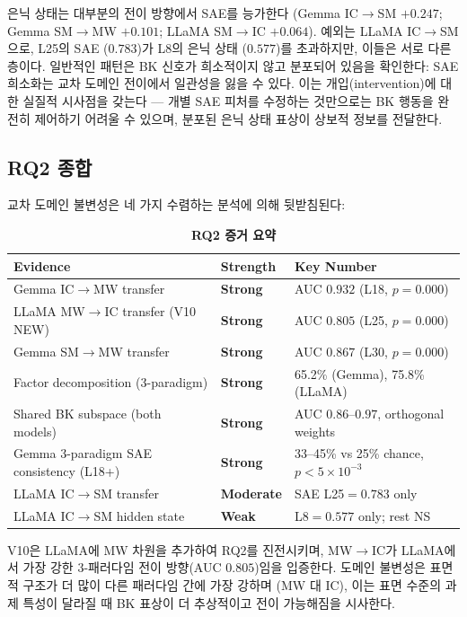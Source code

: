 \documentclass[11pt,a4paper]{article}
\begin{document}
\noindent 은닉 상태는 대부분의 전이 방향에서 SAE를 능가한다 (Gemma IC$\rightarrow$SM $+0.247$; Gemma SM$\rightarrow$MW $+0.101$; LLaMA SM$\rightarrow$IC $+0.064$). 예외는 LLaMA IC$\rightarrow$SM으로, L25의 SAE ($0.783$)가 L8의 은닉 상태 ($0.577$)를 초과하지만, 이들은 서로 다른 층이다. 일반적인 패턴은 BK 신호가 희소적이지 않고 분포되어 있음을 확인한다: SAE 희소화는 교차 도메인 전이에서 일관성을 잃을 수 있다. 이는 개입(intervention)에 대한 실질적 시사점을 갖는다 --- 개별 SAE 피처를 수정하는 것만으로는 BK 행동을 완전히 제어하기 어려울 수 있으며, 분포된 은닉 상태 표상이 상보적 정보를 전달한다.

\subsection{RQ2 종합}

교차 도메인 불변성은 네 가지 수렴하는 분석에 의해 뒷받침된다:

\begin{table}[H]
\centering
\caption*{\textbf{RQ2 증거 요약}}
\footnotesize
\begin{tabular}{llp{7cm}}
\toprule
Evidence & Strength & Key Number \\
\midrule
Gemma IC$\rightarrow$MW transfer & \textbf{Strong} & AUC $0.932$ (L18, $p=0.000$) \\
LLaMA MW$\rightarrow$IC transfer (V10 NEW) & \textbf{Strong} & AUC $0.805$ (L25, $p=0.000$) \\
Gemma SM$\rightarrow$MW transfer & \textbf{Strong} & AUC $0.867$ (L30, $p=0.000$) \\
Factor decomposition (3-paradigm) & \textbf{Strong} & 65.2\% (Gemma), 75.8\% (LLaMA) \\
Shared BK subspace (both models) & \textbf{Strong} & AUC $0.86$--$0.97$, orthogonal weights \\
Gemma 3-paradigm SAE consistency (L18+) & \textbf{Strong} & 33--45\% vs 25\% chance, $p<5\times10^{-3}$ \\
LLaMA IC$\rightarrow$SM transfer & \textbf{Moderate} & SAE L25$=0.783$ only \\
LLaMA IC$\rightarrow$SM hidden state & \textbf{Weak} & L8$=0.577$ only; rest NS \\
\bottomrule
\end{tabular}
\end{table}

\noindent V10은 LLaMA에 MW 차원을 추가하여 RQ2를 진전시키며, MW$\rightarrow$IC가 LLaMA에서 가장 강한 3-패러다임 전이 방향(AUC $0.805$)임을 입증한다. 도메인 불변성은 표면적 구조가 더 많이 다른 패러다임 간에 가장 강하며 (MW 대 IC), 이는 표면 수준의 과제 특성이 달라질 때 BK 표상이 더 추상적이고 전이 가능해짐을 시사한다.
\end{document}
